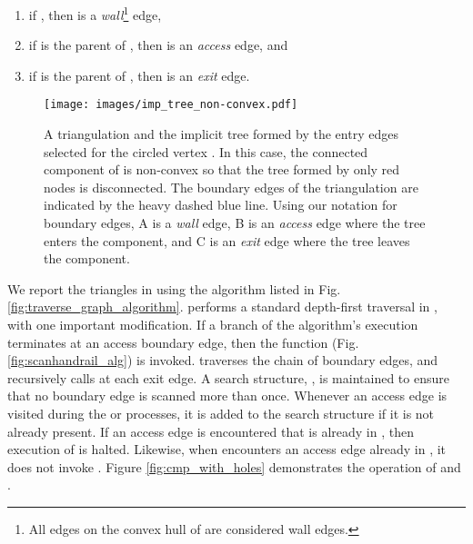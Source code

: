   \begin{enumerate}
    \item if , then  is a \emph{wall}\footnote{
    All edges on the convex hull of  are considered wall edges.} edge,
    \item if  is the parent of , then  is an \emph{access} edge, and 
    \item if  is the parent of , then  is an \emph{exit} edge.
  \end{enumerate}

  \begin{figure}[th]
	  \centering
		  \texttt{[image: images/imp\_tree\_non-convex.pdf]}
	  \caption[Boundary edge definitions]{A triangulation and the implicit tree 
	  formed by the entry edges selected for the circled vertex . 
	  In this case, the connected component of  is non-convex so that the tree 
	  formed by only red nodes is disconnected. 
	  The boundary edges of the triangulation are indicated by the heavy dashed 
	  blue line. 
	  Using our notation for boundary edges, A is a \emph{wall} edge, B is an 
	  \emph{access} edge where the tree enters the component, and C is an 
	  \emph{exit} edge where the tree leaves the component. }
	  \label{fig:imp_tree_non-convex}
  \end{figure}

  We report the triangles in  using the algorithm 
   listed in Fig. \ref{fig:traverse_graph_algorithm}.
   performs a standard depth-first traversal in 
  , with one important modification. 
  If a branch of the algorithm's execution terminates at an access boundary 
  edge, then the function  (Fig. \ref{fig:scanhandrail_alg}) 
  is invoked. 
   traverses the chain of boundary edges, and recursively calls 
   at each exit edge. 
  A search structure, , is maintained to ensure that no boundary edge is 
  scanned more than once.  
  Whenever an access edge is visited during the  
  or  
  processes, it is added to the search structure  if it is not already 
  present. 
  If an access edge is encountered that is already in , then execution 
  of  is halted. 
  Likewise, when  encounters an access edge already in 
  , it does not invoke . 
  Figure \ref{fig:cmp_with_holes} demonstrates the operation of
   and .

